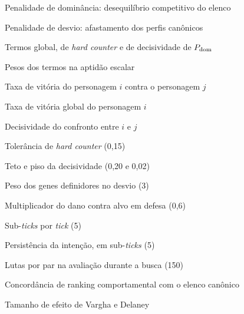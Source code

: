 \begin{simbolos}
    \item[$\Pdom$] Penalidade de dominância: desequilíbrio competitivo do elenco
    \item[$\Pdrift$] Penalidade de desvio: afastamento dos perfis canônicos
    \item[$\tglob$, $\tcap$, $\tdec$] Termos global, de \textit{hard counter} e de decisividade de $\Pdom$
    \item[$\lambda_{\mathrm{drift}}$, $\lambda_{\mathrm{dom}}$] Pesos dos termos na aptidão escalar
    \item[$p_{ij}$] Taxa de vitória do personagem $i$ contra o personagem $j$
    \item[$\bar{p}_i$] Taxa de vitória global do personagem $i$
    \item[$D_{ij}$] Decisividade do confronto entre $i$ e $j$
    \item[$\kappa$] Tolerância de \textit{hard counter} (0,15)
    \item[$\theta$, $\varphi$] Teto e piso da decisividade (0,20 e 0,02)
    \item[$\omega$] Peso dos genes definidores no desvio (3)
    \item[$\rho$] Multiplicador do dano contra alvo em defesa (0,6)
    \item[$S$] Sub-\textit{ticks} por \textit{tick} (5)
    \item[$n_{\mathrm{p}}$] Persistência da intenção, em sub-\textit{ticks} (5)
    \item[$N$] Lutas por par na avaliação durante a busca (150)
    \item[$\tau$] Concordância de ranking comportamental com o elenco canônico
    \item[$\hat{A}_{12}$] Tamanho de efeito de Vargha e Delaney
\end{simbolos}
